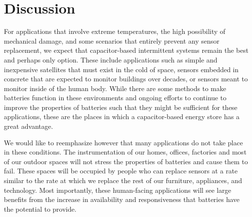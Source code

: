\section{Discussion}
\label{sec:disc}

For applications that involve extreme temperatures,
the high possibility of mechanical damage,
and some scenarios that entirely prevent any sensor
replacement, we expect that capacitor-based intermittent systems remain the best and perhaps
only option.  These include applications such as simple and
inexpensive satellites that must exist in the cold of space,
sensors embedded in concrete that are expected to monitor buildings over decades,
or sensors meant to monitor inside of the human body. While there are some methods
to make batteries function in these environments and ongoing
efforts to continue to improve the properties of batteries such that they
might be sufficient for these applications, these are the places in which
a capacitor-based energy store has a great advantage.

We would like to reemphasize however that many applications do not take place
in these conditions. The instrumentation of our homes, offices,
factories and most of our outdoor spaces will not stress the properties of
batteries and cause them to fail. These spaces will be occupied by people
who can replace sensors at a rate similar to the rate at which we replace
the rest of our furniture, appliances, and technology. Most importantly, these
human-facing applications will see large benefits from the increase in availability
and responsiveness that batteries have the potential to provide.






